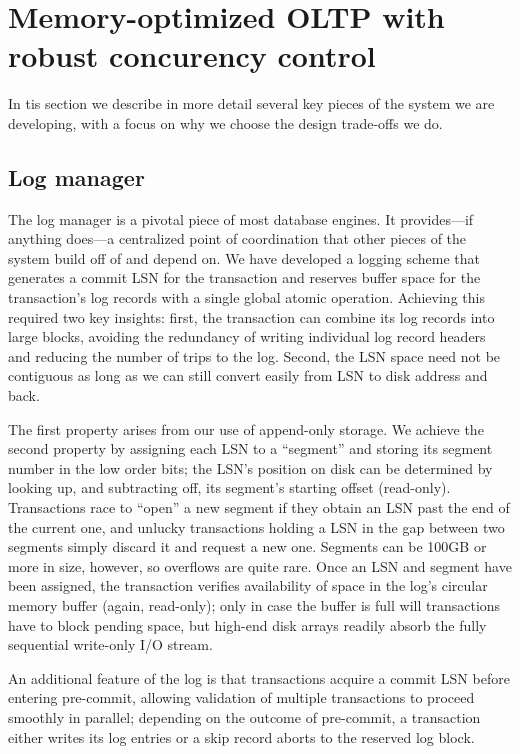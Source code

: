 
\section{Memory-optimized OLTP with robust concurency control}

In tis section we describe in more detail several key pieces of the system we are developing, with a focus on why we choose the design trade-offs we do.

\subsection{Log manager}

The log manager is a pivotal piece of most database engines. It provides---if anything does---a centralized point of coordination that other pieces of the system build off of and depend on. We have developed a logging scheme that  generates a commit LSN for the transaction and reserves buffer space for the transaction's log records with a single global atomic operation. Achieving this required two key insights: first, the transaction can combine its log records into large blocks, avoiding the redundancy of writing individual log record headers and reducing the number of trips to the log. Second, the LSN space need not be contiguous as long as we can still convert easily from LSN to disk address and back.

The first property arises from our use of append-only storage. We achieve the second property by assigning each LSN to a ``segment'' and storing its segment number in the low order bits; the LSN's position on disk can be determined by looking up, and subtracting off, its segment's starting offset (read-only). Transactions race to ``open'' a new segment if they obtain an LSN past the end of the current one, and unlucky transactions holding a LSN in the gap between two segments simply discard it and request a new one. Segments can be 100GB or more in size, however, so overflows are quite rare. Once an LSN and segment have been assigned, the transaction verifies availability of space in the log's circular memory buffer (again, read-only); only in case the buffer is full will transactions have to block pending space, but high-end disk arrays readily absorb the fully sequential write-only I/O stream.

An additional feature of the log is that transactions acquire a commit LSN before entering pre-commit, allowing validation of multiple transactions to proceed smoothly in parallel; depending on the outcome of pre-commit, a transaction either writes its log entries or a skip record aborts to the reserved log block.

